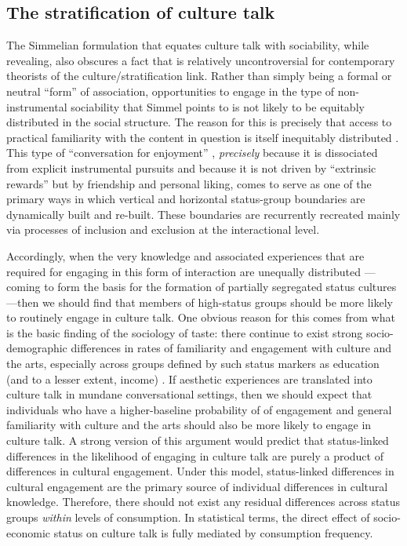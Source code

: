 \subsection{The stratification of culture talk}
The Simmelian formulation that equates culture talk with sociability, while revealing, also obscures a fact that is relatively uncontroversial for contemporary theorists of the culture/stratification link.   Rather than simply being a formal or neutral ``form'' of association, opportunities to engage in the type of non-instrumental sociability that Simmel points to is not likely to be equitably distributed in the social structure.  The reason for this is precisely that access to practical familiarity with the content in question is itself inequitably distributed \citep{bourdieu84}. This type of ``conversation for enjoyment'' \citep[124]{collins75}, \emph{precisely} because it is dissociated from explicit instrumental pursuits and because it is not driven by ``extrinsic rewards'' but by friendship and personal liking, comes to serve as one of the primary ways in which vertical and horizontal status-group boundaries are dynamically built and re-built.  These boundaries are recurrently recreated mainly via processes of inclusion and exclusion at the interactional level. 

Accordingly, when the very knowledge and associated experiences that are required for engaging in this form of interaction are unequally distributed \citep{reay10}---coming to form the basis for the formation of partially segregated status cultures  \citep{bourdieu84}---then we should find that members of high-status groups should be more likely to routinely engage in culture talk.  One obvious reason for this comes from what is the basic finding of the sociology of taste:  there continue to exist strong socio-demographic differences in rates of familiarity and engagement with culture and the arts, especially across groups defined by such status markers as education (and to a lesser extent, income) \citep{bennett_etal08}.  If aesthetic experiences are translated into culture talk in mundane conversational settings, then we should expect that individuals who have a higher-baseline probability of of engagement and general familiarity with culture and the arts should also be more likely to engage in culture talk.  A strong version of this argument would predict that status-linked differences in the likelihood of engaging in culture talk are purely a product of differences in cultural engagement. Under this model, status-linked differences in cultural engagement are the primary source of individual differences in cultural knowledge.  Therefore, there should not exist any residual differences across status groups \emph{within} levels of consumption.  In statistical terms, the direct effect of socio-economic status on culture talk is fully mediated by consumption frequency.

